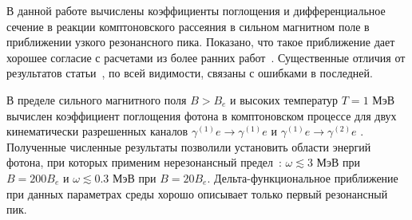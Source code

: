 \documentclass[cp1251%
               ]{jetp} %
\begin{document}
В данной работе вычислены коэффициенты поглощения и дифференциальное сечение в реакции комптоновского рассеяния в сильном магнитном поле в приближении узкого резонансного пика. Показано, что такое приближение дает хорошее согласие с расчетами из более ранних работ~\cite{Harding:1991,Mushtukov:2015,SchwarmD:2017}. Существенные отличия от результатов статьи~\cite{Mushtukov:2016}, по всей видимости, связаны с ошибками в последней. 

В пределе сильного магнитного поля $B>B_e$ и высоких температур $T=1$ МэВ вычислен коэффициент поглощения фотона в комптоновском процессе для двух кинематически разрешенных каналов $\gamma^{(1)} e\to \gamma^{(1)} e$ и $\gamma^{(1)} e\to \gamma^{(2)} e$ . Полученные численные результаты позволили установить области энергий фотона, при которых применим нерезонансный предел~\cite{Chistyakov:2009}: $\omega\lesssim 3$ МэВ при $B=200B_e$ и $\omega\lesssim 0.3$ МэВ при $B=20B_e$. Дельта-функциональное приближение при данных параметрах среды хорошо описывает только первый резонансный пик.






\end{document}
